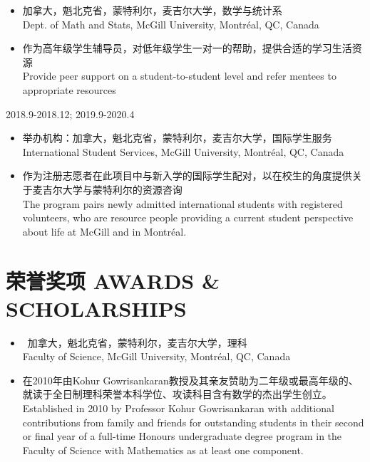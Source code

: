\documentclass[12pt]{CV_CN} %
\begin{document}
\begin{itemize}
	 \item 加拿大，魁北克省，蒙特利尔，麦吉尔大学，数学与统计系\\
	 	Dept. of Math and Stats, McGill University, Montr\'eal, QC, Canada
	\item 作为高年级学生辅导员，对低年级学生一对一的帮助，提供合适的学习生活资源\\
		Provide peer support on a student-to-student level and refer mentees to appropriate resources 
\end{itemize}
 {2018.9-2018.12; 2019.9-2020.4}
\begin{itemize} 
	\item 举办机构：加拿大，魁北克省，蒙特利尔，麦吉尔大学，国际学生服务\\
	International Student Services, McGill University, Montr\'eal, QC, Canada
	\item 作为注册志愿者在此项目中与新入学的国际学生配对，以在校生的角度提供关于麦吉尔大学与蒙特利尔的资源咨询\\
	The program pairs newly admitted international students with registered volunteers, who are resource people providing a current student perspective about life at McGill and in Montr\'eal.  
	\end{itemize}


\section{荣誉奖项 AWARDS \& SCHOLARSHIPS}
\begin{itemize} 
	\item  加拿大，魁北克省，蒙特利尔，麦吉尔大学，理科\\
	Faculty of Science, McGill University, Montr\'eal, QC, Canada
	\item 在2010年由Kohur Gowrisankaran教授及其亲友赞助为二年级或最高年级的、就读于全日制理科荣誉本科学位、攻读科目含有数学的杰出学生创立。 \\
	Established in 2010 by Professor Kohur Gowrisankaran with additional contributions from family and friends for outstanding students in their second or final year of a full-time Honours undergraduate degree program in the Faculty of Science with Mathematics as at least one component.
\end{itemize} 
\end{document}
